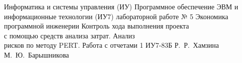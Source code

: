 \documentclass{bmstu}
\begin{document}
\makereporttitle
	{Информатика и системы управления (ИУ)}
	{Программное обеспечение ЭВМ и информационные технологии (ИУ7)}
	{лабораторной работе № 5}
	{Экономика программной инженерии}
	{Контроль хода выполнения проекта\\с помощью средств анализа затрат. Анализ\\рисков по методу PERT. Работа с отчетами}
	{1}
	{ИУ7-83Б}
	{Р.~Р.~Хамзина}
	{М.~Ю.~Барышникова}


\end{document}
